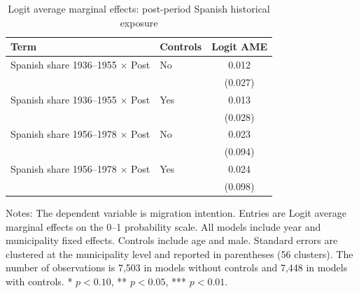 \begin{table}[!htbp]
\normalsize
\renewcommand{\arraystretch}{1.25}
\setlength{\tabcolsep}{6pt}
\centering
\caption{Logit average marginal effects: post-period Spanish historical exposure}
\label{tab:logit_post_share_mfx_stata}
\begin{tabular}{llc}
\hline
Term & Controls & Logit AME \\
\hline
Spanish share 1936--1955 \(\times\) Post & No & 0.012 \\
 & & (0.027) \\
Spanish share 1936--1955 \(\times\) Post & Yes & 0.013 \\
 & & (0.028) \\
\addlinespace
Spanish share 1956--1978 \(\times\) Post & No & 0.023 \\
 & & (0.094) \\
Spanish share 1956--1978 \(\times\) Post & Yes & 0.024 \\
 & & (0.098) \\
\hline
\end{tabular}
\par\vspace{1.5mm}
\begin{minipage}{\textwidth}
{\footnotesize
Notes: The dependent variable is migration intention. Entries are Logit average marginal effects on the 0--1 probability scale. All models include year and municipality fixed effects. Controls include age and male. Standard errors are clustered at the municipality level and reported in parentheses (56 clusters). The number of observations is        7,503 in models without controls and        7,448 in models with controls. * \(p<0.10\), ** \(p<0.05\), *** \(p<0.01\).
}
\end{minipage}
\end{table}
